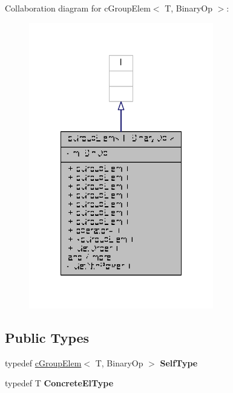 Collaboration diagram for c\-Group\-Elem$<$ T, Binary\-Op $>$\-:
\nopagebreak
\begin{figure}[H]
\begin{center}
\leavevmode
\includegraphics[width=228pt]{classcGroupElem__coll__graph}
\end{center}
\end{figure}
\subsection*{Public Types}
\begin{DoxyCompactItemize}
\item 
\hypertarget{classcGroupElem_a59d8e25f570c976b3c7f13756ada8dc4}{typedef \hyperlink{classcGroupElem}{c\-Group\-Elem}$<$ T, Binary\-Op $>$ {\bfseries Self\-Type}}\label{classcGroupElem_a59d8e25f570c976b3c7f13756ada8dc4}

\item 
\hypertarget{classcGroupElem_a49af5748a3d451f2256fb82266338bca}{typedef T {\bfseries Concrete\-El\-Type}}\label{classcGroupElem_a49af5748a3d451f2256fb82266338bca}

\end{DoxyCompactItemize}
